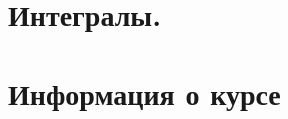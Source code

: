 \maketitle
\tableofcontents


\newpage
\section{Интегралы.}


\newpage
\section{Информация о курсе}
